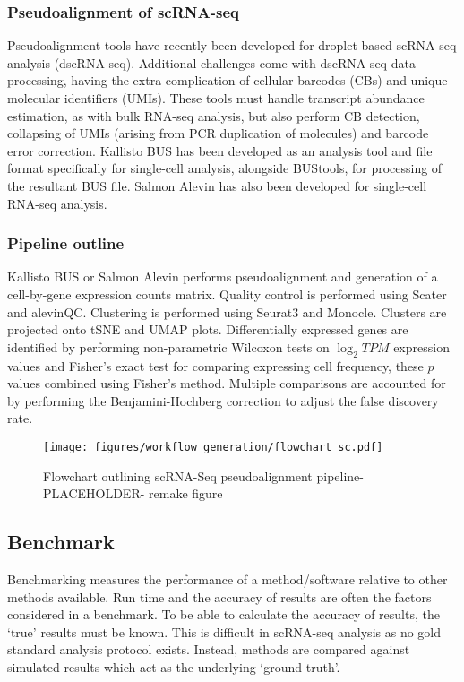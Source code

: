 \subsubsection{Pseudoalignment of scRNA-seq}
Pseudoalignment tools have recently been developed for droplet-based scRNA-seq analysis (dscRNA-seq).
Additional challenges come with dscRNA-seq data processing, having the extra complication of cellular barcodes (CBs) and unique molecular identifiers (UMIs).
These tools must handle transcript abundance estimation, as with bulk RNA-seq analysis, but also perform CB detection, collapsing of UMIs (arising from PCR duplication of molecules) and barcode error correction.
Kallisto BUS\cite{melsted2018barcode} has been developed as an analysis tool and file format specifically for single-cell analysis, alongside BUStools, for processing of the resultant BUS file\cite{melsted2019modular}.
Salmon Alevin\cite{srivastava2019alevin} has also been developed for single-cell RNA-seq analysis.

\subsubsection{Pipeline outline}
Kallisto BUS or Salmon Alevin performs pseudoalignment and generation of a cell-by-gene expression counts matrix.
Quality control is performed using Scater\cite{mccarthy2017scater} and alevinQC.
Clustering is performed using Seurat3\cite{stuart2019comprehensive} and Monocle\cite{trapnell2014dynamics}.
Clusters are projected onto tSNE and UMAP plots.
Differentially expressed genes are identified by performing non-parametric Wilcoxon tests on $\log_2 TPM$ expression values and Fisher's exact test for comparing expressing cell frequency, these $p$ values combined using Fisher's method.
Multiple comparisons are accounted for by performing the Benjamini-Hochberg correction to adjust the false discovery rate.

\begin{figure}[htbp]
\centering
\texttt{[image: figures/workflow\_generation/flowchart\_sc.pdf]}
\caption[scRNA-Seq pseudoalignment pipeline flowchart]{Flowchart outlining scRNA-Seq pseudoalignment pipeline- PLACEHOLDER- remake figure}
\label{fig:flowchart_scRNA}
\end{figure}

\subsection{Benchmark}
Benchmarking measures the performance of a method/software relative to other methods available.
Run time and the accuracy of results are often the factors considered in a benchmark.
To be able to calculate the accuracy of results, the `true' results must be known.
This is difficult in scRNA-seq analysis as no gold standard analysis protocol exists.
Instead, methods are compared against simulated results which act as the underlying `ground truth'.

